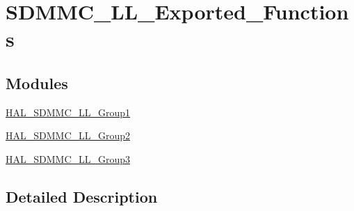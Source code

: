 \hypertarget{group___s_d_m_m_c___l_l___exported___functions}{}\section{S\+D\+M\+M\+C\+\_\+\+L\+L\+\_\+\+Exported\+\_\+\+Functions}
\label{group___s_d_m_m_c___l_l___exported___functions}
\subsection*{Modules}
\begin{DoxyCompactItemize}
\item 
\mbox{\hyperlink{group___h_a_l___s_d_m_m_c___l_l___group1}{H\+A\+L\+\_\+\+S\+D\+M\+M\+C\+\_\+\+L\+L\+\_\+\+Group1}}
\item 
\mbox{\hyperlink{group___h_a_l___s_d_m_m_c___l_l___group2}{H\+A\+L\+\_\+\+S\+D\+M\+M\+C\+\_\+\+L\+L\+\_\+\+Group2}}
\item 
\mbox{\hyperlink{group___h_a_l___s_d_m_m_c___l_l___group3}{H\+A\+L\+\_\+\+S\+D\+M\+M\+C\+\_\+\+L\+L\+\_\+\+Group3}}
\end{DoxyCompactItemize}


\subsection{Detailed Description}
